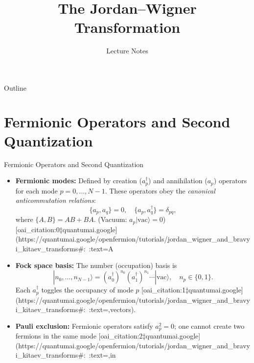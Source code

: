\documentclass{beamer}
\title{The Jordan–Wigner Transformation}
\author{Lecture Notes}
\date{}
\begin{document}
\begin{frame}
\titlepage
\end{frame}

\begin{frame}{Outline}
\tableofcontents
\end{frame}

\section{Fermionic Operators and Second Quantization}
\begin{frame}{Fermionic Operators and Second Quantization}
\begin{itemize}
  \item \textbf{Fermionic modes:} Defined by creation ($a_p^\dagger$) and annihilation ($a_p$) operators for each mode $p=0,\dots,N-1$.  These operators obey the {\it canonical anticommutation relations}:
  \[
    \{a_p, a_q\} = 0, 
    \quad 
    \{a_p, a_q^\dagger\} = \delta_{pq},
  \] 
  where $\{A,B\}=AB+BA$.  (Vacuum: $a_p|\text{vac}\rangle=0$) [oai_citation:0‡quantumai.google](https://quantumai.google/openfermion/tutorials/jordan_wigner_and_bravyi_kitaev_transforms#:~:text=A%
  \item \textbf{Fock space basis:} The number (occupation) basis is 
  $$
  |n_0,\dots,n_{N-1}\rangle = (a_0^\dagger)^{n_0}(a_1^\dagger)^{n_1}\cdots|\text{vac}\rangle,\quad n_p\in\{0,1\}.
  $$
  Each $a_p^\dagger$ toggles the occupancy of mode $p$ [oai_citation:1‡quantumai.google](https://quantumai.google/openfermion/tutorials/jordan_wigner_and_bravyi_kitaev_transforms#:~:text=,vectors).
  \item \textbf{Pauli exclusion:} Fermionic operators satisfy $a_p^2=0$; one cannot create two fermions in the same mode [oai_citation:2‡quantumai.google](https://quantumai.google/openfermion/tutorials/jordan_wigner_and_bravyi_kitaev_transforms#:~:text=,in%
\end{itemize}
\end{frame}
\end{document}
